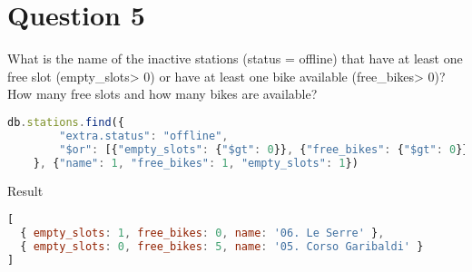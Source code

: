 \section{Question 5}

\begin{question}
  What is the name of the inactive stations (status = offline) that have at
  least one free slot (empty\_slots> 0)
  or have at least one bike available (free\_bikes> 0)? How many free slots
  and how many bikes are available?
\end{question}

\begin{answer}

  \begin{lstlisting}[language=js]
db.stations.find({
        "extra.status": "offline",
        "$or": [{"empty_slots": {"$gt": 0}}, {"free_bikes": {"$gt": 0}}]
    }, {"name": 1, "free_bikes": 1, "empty_slots": 1})
  \end{lstlisting}
  Result
  \begin{lstlisting}[language=js]
[
  { empty_slots: 1, free_bikes: 0, name: '06. Le Serre' },
  { empty_slots: 0, free_bikes: 5, name: '05. Corso Garibaldi' }
]
  \end{lstlisting}

\end{answer}
\pagebreak
